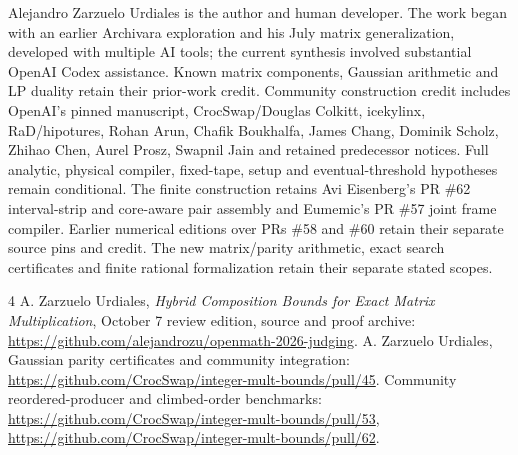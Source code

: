 \documentclass[11pt]{article}
\begin{document}
Alejandro Zarzuelo Urdiales is the author and human developer. The work
began with an earlier Archivara exploration and his July matrix
generalization, developed with multiple AI tools; the current synthesis
involved substantial OpenAI Codex assistance. Known matrix components,
Gaussian arithmetic and LP duality retain their prior-work credit.
Community construction credit includes OpenAI's pinned manuscript,
CrocSwap/Douglas Colkitt, icekylinx, RaD/hipotures, Rohan Arun, Chafik
Boukhalfa, James Chang, Dominik Scholz, Zhihao Chen, Aurel Prosz, Swapnil
Jain and retained predecessor notices. Full analytic, physical compiler,
fixed-tape, setup and eventual-threshold hypotheses remain conditional.
The finite construction retains Avi Eisenberg's PR \#62 interval-strip and core-aware pair
assembly and Eumemic's PR \#57 joint frame compiler. Earlier numerical
editions over PRs \#58 and \#60 retain their separate source pins and credit. The new matrix/parity arithmetic,
exact search certificates and finite rational formalization retain their
separate stated scopes.

\begin{thebibliography}{4}
 A. Zarzuelo Urdiales, \emph{Hybrid Composition Bounds for
Exact Matrix Multiplication}, October 7 review edition, source and proof
archive: \url{https://github.com/alejandrozu/openmath-2026-judging}.
 A. Zarzuelo Urdiales, Gaussian parity certificates and
community integration: \url{https://github.com/CrocSwap/integer-mult-bounds/pull/45}.
 Community reordered-producer and climbed-order
benchmarks: \url{https://github.com/CrocSwap/integer-mult-bounds/pull/53},
\url{https://github.com/CrocSwap/integer-mult-bounds/pull/62}.
\end{thebibliography}
\end{document}
